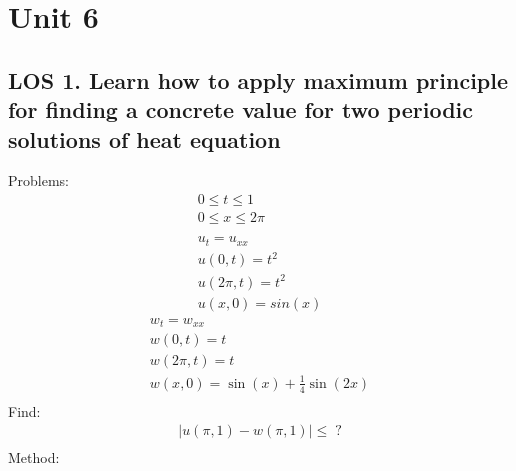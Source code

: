 \documentclass[12pt, a4paper]{article}
\begin{document}
\section*{Unit 6}
\vspace{1em}

\subsection*{LOS 1. Learn how to apply maximum principle for finding a concrete value for two periodic solutions of heat equation}
Problems:
\begin{gather*}
    0 \leq t \leq 1 \\
    0 \leq x \leq 2\pi\\\\
    u_t = u_{xx}\\
    u(0, t) = t^2\\
    u(2\pi, t) = t^2\\
    u(x, 0)=sin(x)
\end{gather*}
\begin{gather*}
    w_t = w_{xx}\\
    w(0, t) = t\\
    w(2\pi, t) = t\\
    w(x, 0) = \sin(x)+\frac{1}{4}\sin(2x)\\
\end{gather*}
Find:
\begin{gather*}
    |u(\pi, 1) - w(\pi, 1)| \leq \;?\\
\end{gather*}
Method:
\end{document}
